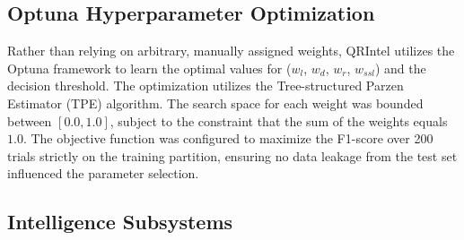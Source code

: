 \documentclass[10pt,twocolumn,letterpaper]{article}
\begin{document}
\subsection{Optuna Hyperparameter Optimization}
Rather than relying on arbitrary, manually assigned weights, QRIntel utilizes the Optuna framework to learn the optimal values for ($w_l$, $w_d$, $w_r$, $w_{ssl}$) and the decision threshold. The optimization utilizes the Tree-structured Parzen Estimator (TPE) algorithm. The search space for each weight was bounded between $[0.0, 1.0]$, subject to the constraint that the sum of the weights equals $1.0$. The objective function was configured to maximize the F1-score over 200 trials strictly on the training partition, ensuring no data leakage from the test set influenced the parameter selection.

\subsection{Intelligence Subsystems}
\end{document}
